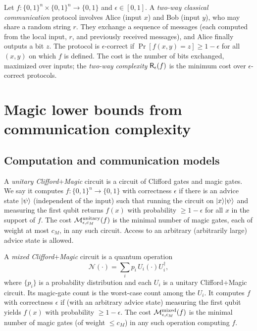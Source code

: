 \begin{definition}
  \label{def:two-way}
  Let $f : \{0,1\}^n \times \{0,1\}^n \to \{0,1\}$ and $\epsilon \in [0,1]$. A
  \emph{two-way classical communication} protocol involves Alice (input $x$) and
  Bob (input $y$), who may share a random string $r$. They exchange a sequence of
  messages (each computed from the local input, $r$, and previously received
  messages), and Alice finally outputs a bit $z$. The protocol is
  $\epsilon$-correct if $\Pr[f(x,y)=z]\ge 1-\epsilon$ for all $(x,y)$ on which $f$
  is defined. The cost is the number of bits exchanged, maximized over inputs;
  the \emph{two-way complexity} $\mathsf{R}_\epsilon(f)$ is the minimum cost over
  $\epsilon$-correct protocols.
\end{definition}

\chapter{Magic lower bounds from communication complexity}

\section{Computation and communication models}

\begin{definition}
  \label{def:unitary-cm}
  A \emph{unitary Clifford$+$Magic} circuit is a circuit of Clifford gates and
  magic gates. We say it computes $f:\{0,1\}^n\to\{0,1\}$ with correctness
  $\epsilon$ if there is an advice state $\lvert \psi\rangle$ (independent of the input)
  such that running the circuit on $\lvert x\rangle\lvert \psi\rangle$ and measuring the first
  qubit returns $f(x)$ with probability $\ge 1-\epsilon$ for all $x$ in the
  support of $f$. The cost $\mathcal{M}^{\mathrm{unitary}}_{\epsilon,c_M}(f)$ is the minimal number of magic
  gates, each of weight at most $c_M$, in any such circuit. Access to an arbitrary
  (arbitrarily large) advice state is allowed.
\end{definition}

\begin{definition}
  \label{def:mixed-cm}
  A \emph{mixed Clifford$+$Magic} circuit is a quantum operation
  \[
    \mathcal{N}(\cdot) = \sum_i p_i\, U_i(\cdot)U_i^\dagger ,
  \]
  where $\{p_i\}$ is a probability distribution and each $U_i$ is a unitary
  Clifford$+$Magic circuit. Its magic-gate count is the worst-case count among the
  $U_i$. It computes $f$ with correctness $\epsilon$ if (with an arbitrary advice
  state) measuring the first qubit yields $f(x)$ with probability $\ge 1-\epsilon$.
  The cost $\mathcal{M}^{\mathrm{mixed}}_{\epsilon,c_M}(f)$ is the minimal number of magic gates (of
  weight $\le c_M$) in any such operation computing $f$.
\end{definition}


